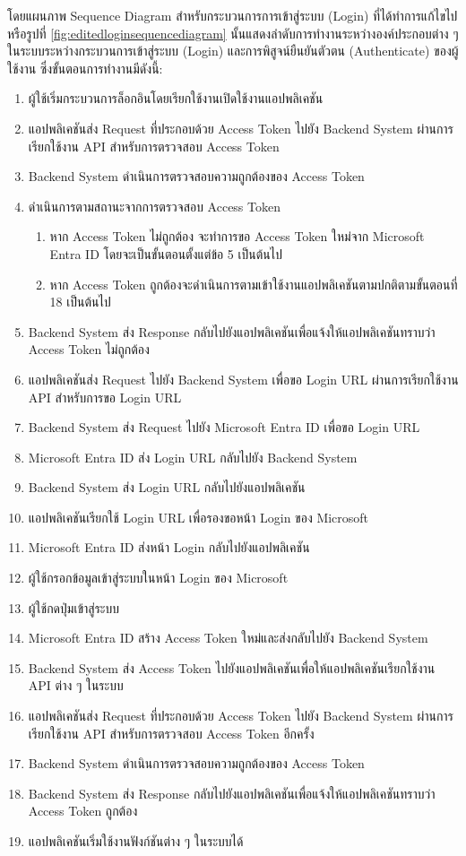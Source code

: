 \documentclass[14pt,oneside,openright,a4paper]{cpe-thai-project}
\begin{document}
  โดยแผนภาพ Sequence Diagram สำหรับกระบวนการการเข้าสู่ระบบ (Login) ที่ได้ทำการแก้ไขไปหรือรูปที่ \ref{fig:editedloginsequencediagram} นั้นแสดงลำดับการทำงานระหว่างองค์ประกอบต่าง ๆ ในระบบระหว่างกระบวนการเข้าสู่ระบบ (Login) และการพิสูจน์ยืนยันตัวตน (Authenticate) ของผู้ใช้งาน ซึ่งขั้นตอนการทำงานมีดังนี้:
  \begin{enumerate}
    \item ผู้ใช้เริ่มกระบวนการล็อกอินโดยเรียกใช้งานเปิดใช้งานแอปพลิเคชัน
    \item แอปพลิเคชันส่ง Request ที่ประกอบด้วย Access Token ไปยัง Backend System ผ่านการเรียกใช้งาน API สำหรับการตรวจสอบ Access Token
    \item Backend System ดำเนินการตรวจสอบความถูกต้องของ Access Token
    \item ดำเนินการตามสถานะจากการตรวจสอบ Access Token 
      \begin{enumerate}
        \item หาก Access Token ไม่ถูกต้อง จะทำการขอ Access Token ใหม่จาก Microsoft Entra ID โดยจะเป็นขั้นตอนตั้งแต่ข้อ 5 เป็นต้นไป 
        \item หาก Access Token ถูกต้องจะดำเนินการตามเข้าใช้งานแอปพลิเคชันตามปกติตามขั้นตอนที่ 18 เป็นต้นไป
      \end{enumerate}
    \item Backend System ส่ง Response กลับไปยังแอปพลิเคชันเพื่อแจ้งให้แอปพลิเคชันทราบว่า Access Token ไม่ถูกต้อง
    \item แอปพลิเคชันส่ง Request ไปยัง Backend System เพื่อขอ Login URL ผ่านการเรียกใช้งาน API สำหรับการขอ Login URL
    \item Backend System ส่ง Request ไปยัง Microsoft Entra ID เพื่อขอ Login URL
    \item Microsoft Entra ID ส่ง Login URL กลับไปยัง Backend System
    \item Backend System ส่ง Login URL กลับไปยังแอปพลิเคชัน
    \item แอปพลิเคชันเรียกใช้ Login URL เพื่อรองขอหน้า Login ของ Microsoft
    \item Microsoft Entra ID ส่งหน้า Login กลับไปยังแอปพลิเคชัน
    \item ผู้ใช้กรอกข้อมูลเข้าสู่ระบบในหน้า Login ของ Microsoft
    \item ผู้ใช้กดปุ่มเข้าสู่ระบบ
    \item Microsoft Entra ID สร้าง Access Token ใหม่และส่งกลับไปยัง Backend System
    \item Backend System ส่ง Access Token ไปยังแอปพลิเคชันเพื่อให้แอปพลิเคชันเรียกใช้งาน API ต่าง ๆ ในระบบ
    \item แอปพลิเคชันส่ง Request ที่ประกอบด้วย Access Token ไปยัง Backend System ผ่านการเรียกใช้งาน API สำหรับการตรวจสอบ Access Token อีกครั้ง
    \item Backend System ดำเนินการตรวจสอบความถูกต้องของ Access Token
    \item Backend System ส่ง Response กลับไปยังแอปพลิเคชันเพื่อแจ้งให้แอปพลิเคชันทราบว่า Access Token ถูกต้อง
    \item แอปพลิเคชันเริ่มใช้งานฟังก์ชันต่าง ๆ ในระบบได้
  \end{enumerate}
  \newpage
\end{document}
